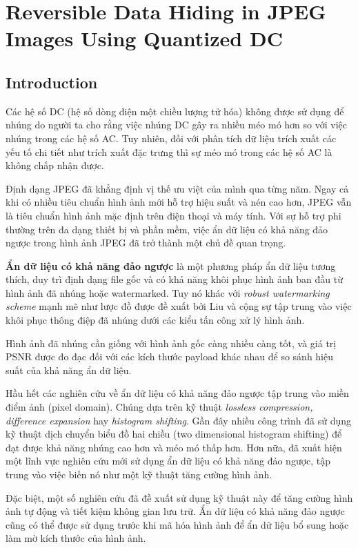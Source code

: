 \chapter{Reversible Data Hiding in JPEG Images Using Quantized DC }
\label{chapter2}

\section{Introduction}

Các hệ số DC (hệ số dòng điện một chiều lượng tử hóa) không được sử dụng để nhúng do người ta cho rằng việc nhúng DC gây ra nhiều méo mó hơn so với việc nhúng trong các hệ số AC. Tuy nhiên, đối với phân tích dữ liệu trích xuất các yếu tố chi tiết như trích xuất đặc trưng thì sự méo mó trong các hệ số AC là không chấp nhận được.  

Định dạng JPEG đã khẳng định vị thế ưu việt của mình qua từng năm. Ngay cả khi có nhiều tiêu chuẩn hình ảnh mới hỗ trợ hiệu suất và nén cao hơn, JPEG vẫn là tiêu chuẩn hình ảnh mặc định trên điện thoại và máy tính. Với sự hỗ trợ phi thường trên đa dạng thiết bị và phần mềm, việc ẩn dữ liệu có khả năng đảo ngược trong hình ảnh JPEG đã trở thành một chủ đề quan trọng. 

\textbf{Ẩn dữ liệu có khả năng đảo ngược} là một phương pháp ẩn dữ liệu tương thích, duy trì định dạng file gốc và có khả năng khôi phục hình ảnh ban đầu từ hình ảnh đã nhúng hoặc watermarked. Tuy nó khác với \textit{robust watermarking scheme} mạnh mẽ như lược đồ được đề xuất bởi Liu và cộng sự \cite{liu2010image} tập trung vào việc khôi phục thông điệp đã nhúng dưới các kiểu tấn công xử lý hình ảnh. 

Hình ảnh đã nhúng cần giống với hình ảnh gốc càng nhiều càng tốt, và giá trị PSNR được đo đạc đối với các kích thước payload khác nhau để so sánh hiệu suất của khả năng ẩn dữ liệu. 

Hầu hết các nghiên cứu về ẩn dữ liệu có khả năng đảo ngược tập trung vào miền điểm ảnh (pixel domain). Chúng dựa trên kỹ thuật \textit{lossless compression, difference expansion} hay \textit{histogram shifting}. Gần đây nhiều công trình đã sử dụng kỹ thuật dịch chuyển biểu đồ hai chiều (two dimensional histogram shifting) để đạt được khả năng nhúng cao hơn và méo mó thấp hơn. Hơn nữa, đã xuất hiện một lĩnh vực nghiên cứu mới sử dụng ẩn dữ liệu có khả năng đảo ngược, tập trung vào việc biến nó như một kỹ thuật tăng cường hình ảnh.  

Đặc biệt, một số nghiên cứu đã đề xuất sử dụng kỹ thuật này để tăng cường hình ảnh tự động và tiết kiệm không gian lưu trữ. Ẩn dữ liệu có khả năng đảo ngược cũng có thể được sử dụng trước khi mã hóa hình ảnh để ẩn dữ liệu bổ sung hoặc làm mờ kích thước của hình ảnh. 

